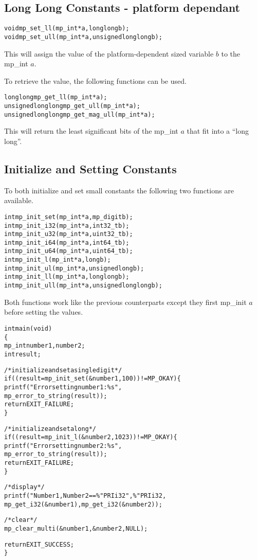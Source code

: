 \documentclass[synpaper]{book}
\begin{document}
\subsection{Long Long Constants - platform dependant}

 
\begin{alltt}
void mp_set_ll (mp_int * a, long long b);
void mp_set_ull (mp_int * a, unsigned long long b);
\end{alltt}

This will assign the value of the platform-dependent sized variable $b$ to the mp\_int $a$.

To retrieve the value, the following functions can be used.

\begin{alltt}
long long mp_get_ll (mp_int * a);
unsigned long long mp_get_ull (mp_int * a);
unsigned long long mp_get_mag_ull (mp_int * a);
\end{alltt}

This will return the least significant bits of the mp\_int $a$ that fit into a ``long long''.

\subsection{Initialize and Setting Constants}
To both initialize and set small constants the following two functions are available.
 
\begin{alltt}
int mp_init_set (mp_int * a, mp_digit b);
int mp_init_i32 (mp_int * a, int32_t b);
int mp_init_u32 (mp_int * a, uint32_t b);
int mp_init_i64 (mp_int * a, int64_t b);
int mp_init_u64 (mp_int * a, uint64_t b);
int mp_init_l   (mp_int * a, long b);
int mp_init_ul  (mp_int * a, unsigned long b);
int mp_init_ll  (mp_int * a, long long b);
int mp_init_ull (mp_int * a, unsigned long long b);
\end{alltt}

Both functions work like the previous counterparts except they first mp\_init $a$ before setting the values.

\begin{alltt}
int main(void)
\{
   mp_int number1, number2;
   int    result;

   /* initialize and set a single digit */
   if ((result = mp_init_set(&number1, 100)) != MP_OKAY) \{
      printf("Error setting number1: \%s",
             mp_error_to_string(result));
      return EXIT_FAILURE;
   \}

   /* initialize and set a long */
   if ((result = mp_init_l(&number2, 1023)) != MP_OKAY) \{
      printf("Error setting number2: \%s",
             mp_error_to_string(result));
      return EXIT_FAILURE;
   \}

   /* display */
   printf("Number1, Number2 == \%" PRIi32 ", \%" PRIi32,
          mp_get_i32(&number1), mp_get_i32(&number2));

   /* clear */
   mp_clear_multi(&number1, &number2, NULL);

   return EXIT_SUCCESS;
\}
\end{alltt}
\end{document}
